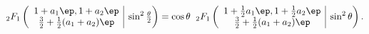 \begin{equation}
{}_{2}F_1 \left(\begin{array}{c|}
1+a_1 \ep, 1+ a_2 \ep \\
\tfrac{3}{2}+ \tfrac{1}{2}(a_1+a_2)\ep 
\end{array} ~\sin^2\tfrac{\theta}{2}
\right) =
\cos\theta \;\;
{}_{2}F_1 \left(\begin{array}{c|} 1+\tfrac{1}{2} a_1 \ep,
1+\tfrac{1}{2} a_2 \ep \\
\tfrac{3}{2}+\tfrac{1}{2}(a_1+a_2)\ep \end{array} ~\sin^2\theta \right) .
\label{less_trivial2}
\end{equation}

